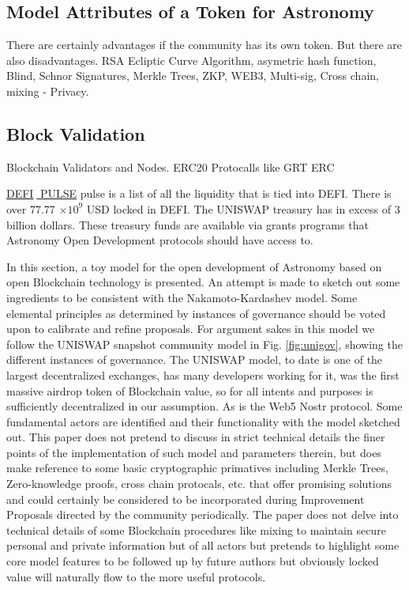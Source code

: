 \documentclass[final,5p,times,twocolumn,authoryear]{elsarticle}
\begin{document}
\subsection{Model Attributes of a Token for Astronomy}
\label{subsec:btc4}
There are certainly advantages if the community has its own token. But there are also disadvantages. RSA Ecliptic Curve Algorithm, asymetric hash function, Blind, Schnor Signatures, Merkle Trees, ZKP,  WEB3, Multi-sig, Cross chain, mixing - Privacy. 

\subsection{Block Validation}
\label{subsec: validator}
Blockchain Validators and Nodes. ERC20 Protocalls like GRT ERC   

\href{https://defipulse.com/}{DEFI$\;$ PULSE} pulse is a list of all the liquidity that is tied into DEFI. There is over 77.77 $\times 10^{9}$ USD locked in DEFI. The UNISWAP treasury has in excess of 3 billion dollars. These treasury funds are available via grants programs that Astronomy Open Development protocols should have access to.

In this section, a toy model for the open development of Astronomy based on open Blockchain technology is presented. An attempt is made to sketch out some ingredients to be consistent with the Nakamoto-Kardashev model. Some elemental principles as determined by instances of governance should be voted upon to calibrate and refine proposals. For argument sakes in this model we follow the UNISWAP snapshot community model in Fig. \ref{fig:unigov}, showing the different instances of governance. The UNISWAP model, to date is one of the largest decentralized exchanges, has many developers working for it, was the first massive airdrop token of Blockchain value, so for all intents and purposes is sufficiently decentralized in our assumption. As is the Web5 Nostr protocol. Some fundamental actors are identified and their functionality with the model sketched out. This paper does not pretend to discuss in strict technical details the finer points of the implementation of such model and parameters therein, but does make reference to some basic cryptographic primatives including Merkle Trees, Zero-knowledge proofs, cross chain protocals, etc. that offer promising solutions and could certainly be considered to be incorporated during Improvement Proposals directed by the community periodically. The paper does not delve into technical details of some Blockchain procedures like mixing to maintain secure personal and private information but of all actors but pretends to highlight some core model features to be followed up by future authors but obviously  locked value will naturally flow to the more useful protocols.  
 
\end{document}
